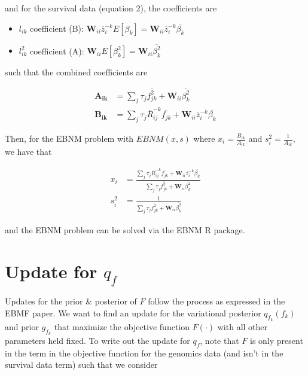 \documentclass{article}[12pt]
\begin{document}
and for the survival data (equation 2), the coefficients are

\begin{itemize}
    \item $l_{ik}$ coefficient (B): $\mathbf{W}_{ii}\overline{z}^{-k}_{i}E\left[\beta_{k}\right] = \mathbf{W}_{ii}\overline{z}^{-k}_{i}\overline{\beta_{k}}$

    \item $l_{ik}^{2}$ coefficient (A): $\mathbf{W}_{ii}E\left[\beta^{2}_{k}\right] = \mathbf{W}_{ii}\overline{\beta^{2}_{k}}$
\end{itemize}

such that the combined coefficients are

\begin{align}
    \mathbf{A_{ik}} &= \sum_{j}\tau_{j}\overline{f^{2}_{jk}} + \mathbf{W}_{ii}\overline{\beta^{2}_{k}}\label{eq:A-L}\\
    \mathbf{B_{ik}} &= \sum_{j}\tau_{j}\overline{R}^{-k}_{ij}\overline{f_{jk}} + \mathbf{W}_{ii}\overline{z}^{-k}_{i}\overline{\beta_{k}}\label{eq:B-L}
\end{align}

Then, for the EBNM problem with $EBNM(x,s)$ where $x_i = \frac{B_{ik}}{A_{ik}}$ and $s^{2}_{i} = \frac{1}{A_{ik}}$, we have that

\begin{align}
    x_i &= \frac{\sum_{j}\tau_{j}\overline{R}^{-k}_{ij}\overline{f_{jk}} + \mathbf{W}_{ii}\overline{z}^{-k}_{i}\overline{\beta_{k}}}{\sum_{j}\tau_{j}\overline{f^{2}_{jk}} + \mathbf{W}_{ii}\overline{\beta^{2}_{k}}}\label{eq:xi-L}\\
    s^{2}_{i} &= \frac{1}{\sum_{j}\tau_{j}\overline{f^{2}_{jk}} + \mathbf{W}_{ii}\overline{\beta^{2}_{k}}}\label{eq:si-L}
\end{align}

and the EBNM problem can be solved via the EBNM R package.
\section{Update for $q_{f}$}

Updates for the prior \& posterior of $F$ follow the process as expressed in the EBMF paper. We want to find an update for the variational posterior $q_{f_k}(f_k)$ and prior $g_{f_k}$ that maximize the objective function $F(\cdot)$ with all other parameters held fixed. To write out the update for $q_f$, note that $F$ is only present in the term in the objective function for the genomics data (and isn't in the survival data term) such that we consider
\end{document}
